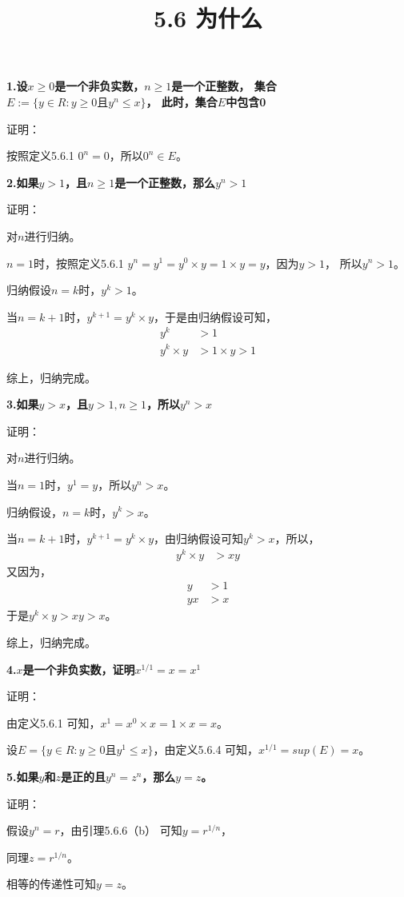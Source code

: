 \documentclass{article}
\theoremstyle{mystyle}
\begin{document}
\title{5.6 为什么}
\maketitle


\textbf{1.设$x \geq 0$是一个非负实数，$n \geq 1$是一个正整数，
  集合$E:=\{y \in R : y \geq 0 \text{且} y^n \leq x\}$，
  此时，集合$E$中包含0}

证明：

按照定义5.6.1 $0^n = 0$，所以$0^n \in E$。

\textbf{2.如果$y > 1$，且$n \geq 1$是一个正整数，那么$y^n > 1$}

证明：

对$n$进行归纳。

$n = 1$时，按照定义5.6.1 $y^n=y^1=y^0 \times y = 1 \times y = y$，因为$y > 1$，
所以$y^n > 1$。

归纳假设$n = k$时，$y^k > 1$。

当$n = k+1$时，$y^{k+1} = y^k \times y$，于是由归纳假设可知，
\begin{align*}
  y^k          & > 1              \\
  y^k \times y & > 1 \times y > 1
\end{align*}

综上，归纳完成。

\textbf{3.如果$y > x$，且$y > 1, n \geq 1$，所以$y^n > x$}

证明：

对$n$进行归纳。

当$n=1$时，$y^1 = y$，所以$y^n > x$。

归纳假设，$n=k$时，$y^k > x$。

当$n = k+1$时，$y^{k+1} = y^k \times y$，由归纳假设可知$y^k > x$，所以，
\begin{align*}
  y^k \times y & > xy
\end{align*}
又因为，
\begin{align*}
  y  & > 1 \\
  yx & > x
\end{align*}
于是$y^k \times y > xy > x$。

综上，归纳完成。

\textbf{4.$x$是一个非负实数，证明$x^{1/1}=x=x^1$}

证明：

由定义5.6.1 可知，$x^1 = x^0 \times x = 1 \times x = x$。

设$E=\{y \in R: y \geq 0 \text{且} y^1 \leq x\}$，由定义5.6.4 可知，$x^{1/1} = sup(E) = x$。

\textbf{5.如果$y$和$z$是正的且$y^n=z^n$，那么$y=z$。}

证明：

假设$y^n = r$，由引理5.6.6（b） 可知$y = r^{1/n}$，

同理$z = r^{1/n}$。

相等的传递性可知$y=z$。
\end{document}
